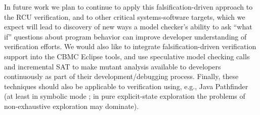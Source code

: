 \documentclass[conference]{IEEEtran}
\begin{document}
In future work we plan to continue to apply this falsification-driven
approach to the RCU verification, and to other critical
systems-software targets, which we expect will lead to discovery of
new ways a model checker's ability to ask ``what if'' questions about
program behavior \cite{GroceDist,MakeMost} can improve developer
understanding of verification efforts.   We would also like to
integrate falsification-driven verification support into the CBMC
Eclipse tools, and use speculative model checking calls and
incremental SAT to make mutant analysis available to developers
continuously as part of their development/debugging process.  Finally,
these techniques should also be applicable to verification using,
e.g., Java Pathfinder \cite{JPF2}  (at least in symbolic mode \cite{SymJPF}; in pure
explicit-state exploration the problems of non-exhaustive exploration
may dominate).

%







%
%
%



\end{document}

